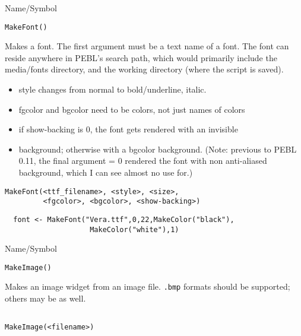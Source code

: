 \begin{desc}{Name/Symbol}
\item[Name/Symbol]	\verb+MakeFont()+

\item[Description]	Makes a font.  The first argument must be a text
  name of a font.  The font can reside anywhere in PEBL's search path,
  which would primarily include the media/fonts directory, and the
  working directory (where the script is saved).
  \begin{itemize}
  \item  style changes from normal to bold/underline, italic.
  \item    fgcolor and bgcolor need to be colors, not just names of colors
  \item  if show-backing is 0, the font gets rendered with an invisible
  \item    background; otherwise with a bgcolor background. (Note: previous to PEBL 0.11, the final argument = 0 rendered the font  with non anti-aliased background, which I can see almost no use for.)
\end{itemize}
\item[Usage]
\begin{verbatim}
MakeFont(<ttf_filename>, <style>, <size>, 
         <fgcolor>, <bgcolor>, <show-backing>)
\end{verbatim}

\item[Example]	
\begin{verbatim}
  font <- MakeFont("Vera.ttf",0,22,MakeColor("black"),
                    MakeColor("white"),1)
\end{verbatim}

\item[See Also]	
\end{desc}

\begin{desc}{Name/Symbol}
\item[Name/Symbol]	\verb+MakeImage()+

\item[Description]	Makes an image widget from an image file.
		\texttt{.bmp} formats should be supported; others may be as well.

\item[Usage]		
\begin{verbatim}

MakeImage(<filename>)
\end{verbatim}

\item[Example]	

\item[See Also]	
\end{desc}



